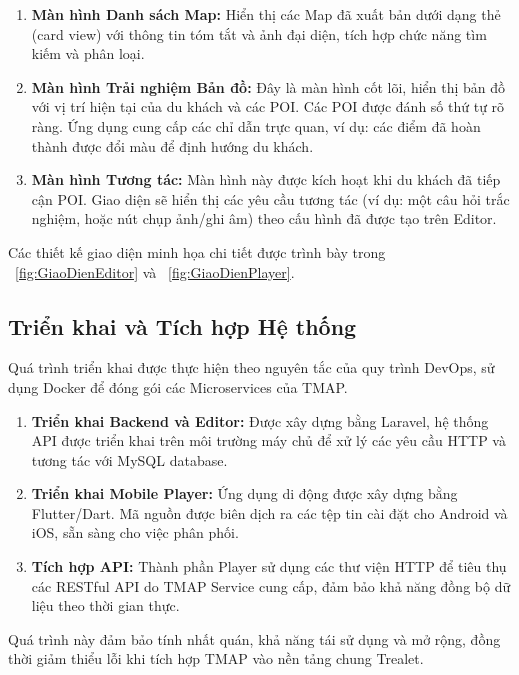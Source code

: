 \begin{enumerate}
    \item \textbf{Màn hình Danh sách Map:} Hiển thị các Map đã xuất bản dưới dạng thẻ (card view) với thông tin tóm tắt và ảnh đại diện, tích hợp chức năng tìm kiếm và phân loại.
    \item \textbf{Màn hình Trải nghiệm Bản đồ:} Đây là màn hình cốt lõi, hiển thị bản đồ với vị trí hiện tại của du khách và các POI. Các POI được đánh số thứ tự rõ ràng. Ứng dụng cung cấp các chỉ dẫn trực quan, ví dụ: các điểm đã hoàn thành được đổi màu để định hướng du khách.
    \item \textbf{Màn hình Tương tác:} Màn hình này được kích hoạt khi du khách đã tiếp cận POI. Giao diện sẽ hiển thị các yêu cầu tương tác (ví dụ: một câu hỏi trắc nghiệm, hoặc nút chụp ảnh/ghi âm) theo cấu hình đã được tạo trên Editor.
\end{enumerate}
Các thiết kế giao diện minh họa chi tiết được trình bày trong \figurename~\ref{fig:GiaoDienEditor} và \figurename~\ref{fig:GiaoDienPlayer}.



\subsection{Triển khai và Tích hợp Hệ thống}

Quá trình triển khai được thực hiện theo nguyên tắc của quy trình DevOps, sử dụng Docker để đóng gói các Microservices của TMAP.
\begin{enumerate}
    \item \textbf{Triển khai Backend và Editor:} Được xây dựng bằng Laravel, hệ thống API được triển khai trên môi trường máy chủ để xử lý các yêu cầu HTTP và tương tác với MySQL database.
    \item \textbf{Triển khai Mobile Player:} Ứng dụng di động được xây dựng bằng Flutter/Dart. Mã nguồn được biên dịch ra các tệp tin cài đặt cho Android và iOS, sẵn sàng cho việc phân phối.
    \item \textbf{Tích hợp API:} Thành phần Player sử dụng các thư viện HTTP để tiêu thụ các RESTful API do TMAP Service cung cấp, đảm bảo khả năng đồng bộ dữ liệu theo thời gian thực.
\end{enumerate}
Quá trình này đảm bảo tính nhất quán, khả năng tái sử dụng và mở rộng, đồng thời giảm thiểu lỗi khi tích hợp TMAP vào nền tảng chung Trealet.